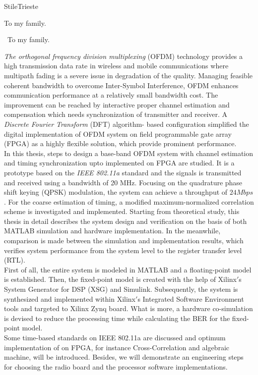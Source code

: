 \documentclass[12pt,oneside,cucitura]{toptesi}
\begin{document}
\english
{}

\expandafter\ifx\csname StileTrieste\endcsname\relax
    \frontespizio
\else
    \paginavuota
    \begin{dedica}
       To my family.

        \textdagger\ To my family.
    \end{dedica}
    \tomo
\fi

%
\cleardoublepage

\sommario
\textit{The orthogonal frequency division multiplexing} (OFDM) technology provides a high transmission data rate in wireless and mobile communications where multipath fading is a severe issue in degradation of the quality. Managing feasible coherent bandwidth to overcome Inter-Symbol Interference, OFDM enhances communication performance at a relatively small bandwidth cost. The improvement can be reached by interactive proper channel estimation and compensation which needs synchronization of transmitter and receiver. A \textit{Discrete Fourier Transform} (DFT) algorithm- based configuration simplified the digital implementation of OFDM system on field programmable gate array (FPGA) as a highly flexible solution, which provide prominent performance.\\
In this thesis, steps to design a base-band OFDM system with channel estimation and timing synchronization upto implemented on FPGA are studied. It is a prototype based on the \textit{IEEE 802.11a} standard and the signals is transmitted and received using a bandwidth of 20 MHz. Focusing on the quadrature phase shift keying (QPSK) modulation, the system can achieve a throughput of $24 Mbps$. For the coarse estimation of timing, a modified maximum-normalized correlation scheme is investigated and implemented. Starting from theoretical study, this thesis in detail describes the system design and verification on the basis of both MATLAB simulation and hardware implementation. In the meanwhile, comparison is made between the simulation and implementation results, which verifies system performance from the system level to the register transfer level (RTL).\\
First of all, the entire system is modeled in MATLAB and a floating-point model is established. Then, the fixed-point model is created with the help of Xilinx$'$s System Generator for DSP (XSG) and Simulink. Subsequently, the system is synthesized and implemented within Xilinx$'$s Integrated Software Environment tools and targeted to Xilinx Zynq board. What is more, a hardware co-simulation is devised to reduce the processing time while calculating the BER for the fixed-point model.\\
Some time-based standards on IEEE 802.11a are discussed and optimum implementation of on FPGA, for instance Cross-Correlation and algebraic machine, will be introduced. Besides, we will demonstrate an engineering steps for choosing the radio board and the processor software implementations.\\
\end{document}
